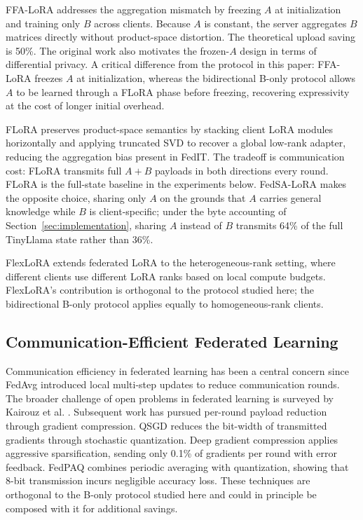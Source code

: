 \documentclass[iicol,pdflatex,sn-mathphys-num]{sn-jnl}
\begin{document}
FFA-LoRA \cite{sun2024ffalora} addresses the aggregation mismatch by freezing $A$ at initialization and training only $B$ across clients. Because $A$ is constant, the server aggregates $B$ matrices directly without product-space distortion. The theoretical upload saving is 50\%. The original work also motivates the frozen-$A$ design in terms of differential privacy. A critical difference from the protocol in this paper: FFA-LoRA freezes $A$ at initialization, whereas the bidirectional B-only protocol allows $A$ to be learned through a FLoRA phase before freezing, recovering expressivity at the cost of longer initial overhead.

FLoRA \cite{wang2024flora} preserves product-space semantics by stacking client LoRA modules horizontally and applying truncated SVD to recover a global low-rank adapter, reducing the aggregation bias present in FedIT. The tradeoff is communication cost: FLoRA transmits full $A{+}B$ payloads in both directions every round. FLoRA is the full-state baseline in the experiments below. FedSA-LoRA \cite{guo2025fedsalora} makes the opposite choice, sharing only $A$ on the grounds that $A$ carries general knowledge while $B$ is client-specific; under the byte accounting of Section~\ref{sec:implementation}, sharing $A$ instead of $B$ transmits 64\% of the full TinyLlama state rather than 36\%.

FlexLoRA \cite{bai2024flexlora} extends federated LoRA to the heterogeneous-rank setting, where different clients use different LoRA ranks based on local compute budgets. FlexLoRA's contribution is orthogonal to the protocol studied here; the bidirectional B-only protocol applies equally to homogeneous-rank clients.

\subsection{Communication-Efficient Federated Learning}
Communication efficiency in federated learning has been a central concern since FedAvg \cite{mcmahan2017communication} introduced local multi-step updates to reduce communication rounds. The broader challenge of open problems in federated learning is surveyed by Kairouz et al. \cite{kairouz2021advances}. Subsequent work has pursued per-round payload reduction through gradient compression. QSGD \cite{alistarh2017qsgd} reduces the bit-width of transmitted gradients through stochastic quantization. Deep gradient compression \cite{lin2017deep} applies aggressive sparsification, sending only 0.1\% of gradients per round with error feedback. FedPAQ \cite{reisizadeh2020fedpaq} combines periodic averaging with quantization, showing that 8-bit transmission incurs negligible accuracy loss. These techniques are orthogonal to the B-only protocol studied here and could in principle be composed with it for additional savings.
\end{document}
